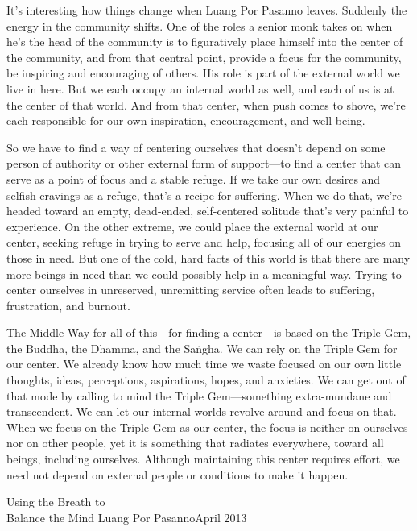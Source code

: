 
It's interesting how things change when Luang Por Pasanno leaves. 
Suddenly the energy in the community shifts. One of the roles a senior 
monk takes on when he's the head of the community is to figuratively 
place himself into the center of the community, and from that central 
point, provide a focus for the community, be inspiring and encouraging 
of others. His role is part of the external world we live in here. But 
we each occupy an internal world as well, and each of us is at the 
center of that world. And from that center, when push comes to shove, 
we're each responsible for our own inspiration, encouragement, and 
well-being.

So we have to find a way of centering ourselves that doesn't depend on 
some person of authority or other external form of support---to find a 
center that can serve as a point of focus and a stable refuge. If we 
take our own desires and selfish cravings as a refuge, that's a recipe 
for suffering. When we do that, we're headed toward an empty, 
dead-ended, self-centered solitude that's very painful to experience. 
On the other extreme, we could place the external world at our center, 
seeking refuge in trying to serve and help, focusing all of our 
energies on those in need. But one of the cold, hard facts of this 
world is that there are many more beings in need than we could possibly 
help in a meaningful way. Trying to center ourselves in unreserved, 
unremitting service often leads to suffering, frustration, and burnout.

The Middle Way for all of this---for finding a center---is based on the 
Triple Gem, the Buddha, the Dhamma, and the Saṅgha. We can rely on 
the Triple Gem for our center. We already know how much time we waste 
focused on our own little thoughts, ideas, perceptions, aspirations, 
hopes, and anxieties. We can get out of that mode by calling to mind 
the Triple Gem---something extra-mundane and transcendent. We can let 
our internal worlds revolve around and focus on that. When we focus on 
the Triple Gem as our center, the focus is neither on ourselves nor on 
other people, yet it is something that radiates everywhere, toward all 
beings, including ourselves. Although maintaining this center requires 
effort, we need not depend on external people or conditions to make it 
happen.

{Using the Breath to\\Balance the Mind}
{Luang Por Pasanno}{April 2013}

